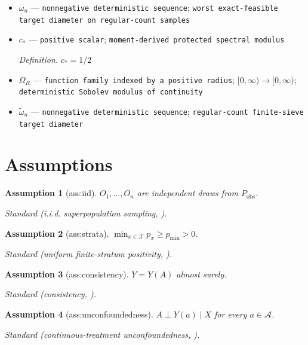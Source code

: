 \documentclass{article}
\newtheorem{assumption}{Assumption}
\begin{document}
\begin{itemize}
  \item \(\omega_n\) --- \texttt{nonnegative deterministic sequence}; \texttt{worst exact-\allowbreak{}feasible target diameter on regular-\allowbreak{}count samples}
  \item \(c_*\) --- \texttt{positive scalar}; \texttt{moment-\allowbreak{}derived protected spectral modulus}
  \par\smallskip\noindent\emph{Definition.} \(c_*=1/2\)
  \item \(\Omega_R\) --- \texttt{function family indexed by a positive radius}; \([0,\infty)\to[0,\infty)\); \texttt{deterministic Sobolev modulus of continuity}
  \item \(\widetilde\omega_n\) --- \texttt{nonnegative deterministic sequence}; \texttt{regular-\allowbreak{}count finite-\allowbreak{}sieve target diameter}
\end{itemize}

\section{Assumptions}

\begin{assumption}[ass:iid]\label{ass:iid}
\(O_1,\ldots,O_n\) are independent draws from \(P_{\mathrm{obs}}\).
\par\smallskip\noindent\emph{Standard} (i.i.d. superpopulation sampling, \cite{HuangZhang2023}).
\end{assumption}

\begin{assumption}[ass:strata]\label{ass:strata}
\(\min_{x\in\mathcal X}p_x\ge p_{\min}>0\).
\par\smallskip\noindent\emph{Standard} (uniform finite-stratum positivity, \cite{HuangZhang2023}).
\end{assumption}

\begin{assumption}[ass:consistency]\label{ass:consistency}
\(Y=Y(A)\) almost surely.
\par\smallskip\noindent\emph{Standard} (consistency, \cite{HuangZhang2023}).
\end{assumption}

\begin{assumption}[ass:unconfoundedness]\label{ass:unconfoundedness}
\(A\perp Y(a)\mid X\) for every \(a\in\mathcal A\).
\par\smallskip\noindent\emph{Standard} (continuous-treatment unconfoundedness, \cite{HuangZhang2023}).
\end{assumption}
\end{document}
